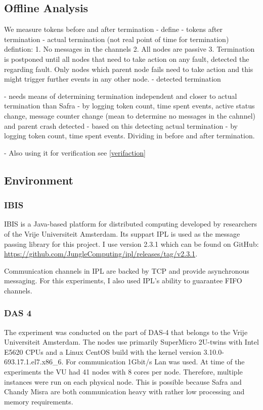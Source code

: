   

\subsection{Offline Analysis}
 We measure tokens before and after termination
 - define 
 - tokens after termination
 - actual termination (not real point of time for termination)
 defintion:
 1. No messages in the channels
 2. All nodes are passive
 3. Termination is postponed until all nodes that need to take action on any fault, detected the regarding fault. Only nodes which parent node fails need to take action and this might trigger further events in any other node.
 - detected termination
 
 - needs means of determining termination independent and closer to actual termination than Safra
 - by logging token count, time spent events, active status change, message counter change (mean to determine no messages in the cahnnel) and parent crash detected
 - based on this detecting actual termination
 - by logging token count, time spent events. Dividing in before and after termination.
 
 - Also using it for verification  see \cref{verifaction}

\subsection{Environment}
\subsubsection{IBIS}
  IBIS is a Java-based platform for distributed computing developed by researchers of the Vrije Universiteit Amsterdam. 
  Its suppart IPL is used as the message passing library for this project. 
  I use version 2.3.1 which can be found on GitHub: \href{https://github.com/JungleComputing/ipl/releases/tag/v2.3.1}{https://github.com/JungleComputing/ipl/releases/tag/v2.3.1}.
  
  Communication channels in IPL are backed by TCP and provide asynchronous messaging.
  For this experiments, I also used IPL's ability to guarantee FIFO channels.
\subsubsection{DAS 4}
  The experiment was conducted on the part of DAS-4 that belongs to the Vrije Universiteit Amsterdam. 
  The nodes use primarily SuperMicro 2U-twins with Intel E5620 CPUs and a Linux CentOS build with the kernel version 3.10.0-693.17.1.el7.x86\_6.
  For communication 1Gbit/s Lan was used.
  At time of the experiments the VU had 41 nodes with 8 cores per node.
  Therefore, multiple instances were run on each physical node.
  This is possible because Safra and Chandy Misra are both communication heavy with rather low processing and memory requirements.
 
